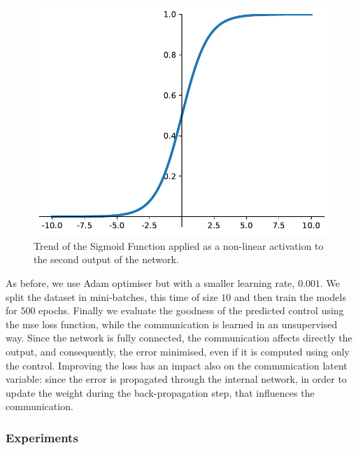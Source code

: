 \begin{figure}[!htb]
	\centering
	\includegraphics[width=.5\textwidth]{contents/images/sigmoid2}%
	\caption[Trend of the Sigmoid activation function.]{Trend of the Sigmoid 
	Function applied as a non-linear activation to the second output of the 
	network.}
	\label{fig:sigmoid}
\end{figure}

As before, we use Adam optimiser but with a smaller learning rate, $0.001$. 
We split the dataset in mini-batches, this time of size $10$ and then train 
the models for $500$ epochs. 
Finally we evaluate the goodness of the predicted control using the \gls{mse} 
loss function, while the communication is learned in an unsupervised way.
Since the network is fully connected, the communication affects directly the 
output, and consequently, the error minimised, even if it is computed using 
only the control. Improving the loss has an impact also on the 
communication latent variable: since the error is propagated through the 
internal network, in order to update the weight during the back-propagation 
step, that influences the communication.

\subsubsection{Experiments}
\label{subsubsec:expcomm}

